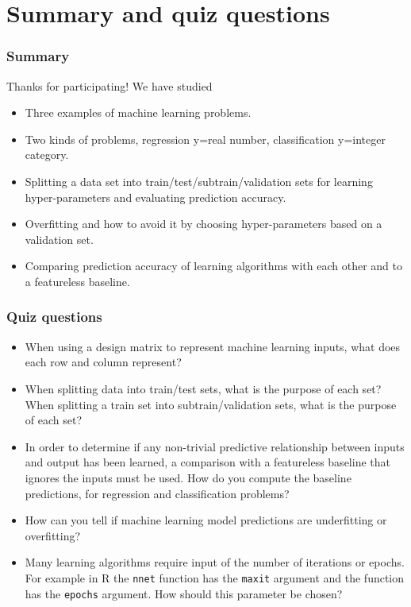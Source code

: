\documentclass{beamer}
\begin{document}
\section{Summary and quiz questions}

\begin{frame}
  \frametitle{Summary}
  Thanks for participating! We have studied
  \begin{itemize}
  \item Three examples of machine learning problems.
  \item Two kinds of problems, regression y=real number,
    classification y=integer category.
  \item Splitting a data set into train/test/subtrain/validation sets
    for learning hyper-parameters and evaluating prediction accuracy.
  \item Overfitting and how to avoid it by choosing hyper-parameters
    based on a validation set.
  \item Comparing prediction accuracy of learning algorithms with each
    other and to a featureless baseline.
  \end{itemize}
\end{frame}

\begin{frame}
  \frametitle{Quiz questions}
  \begin{itemize}
\item When using a design matrix to represent machine learning inputs,
  what does each row and column represent?
\item When splitting data into train/test sets, what is the purpose of
  each set? When splitting a train set into subtrain/validation sets,
  what is the purpose of each set?
\item In order to determine if any non-trivial predictive relationship
  between inputs and output has been learned, a comparison with a
  featureless baseline that ignores the inputs must be used. How do you compute
  the baseline predictions, for regression and classification
  problems?
\item How can you tell if machine learning model predictions are
  underfitting or overfitting?
\item Many learning algorithms require input of the number of
  iterations or epochs. For example in R the \texttt{nnet} function
  has the \texttt{maxit} argument and the  function
  has the \texttt{epochs} argument. How should this parameter be
  chosen?
  \end{itemize}
\end{frame}
 
\end{document}

